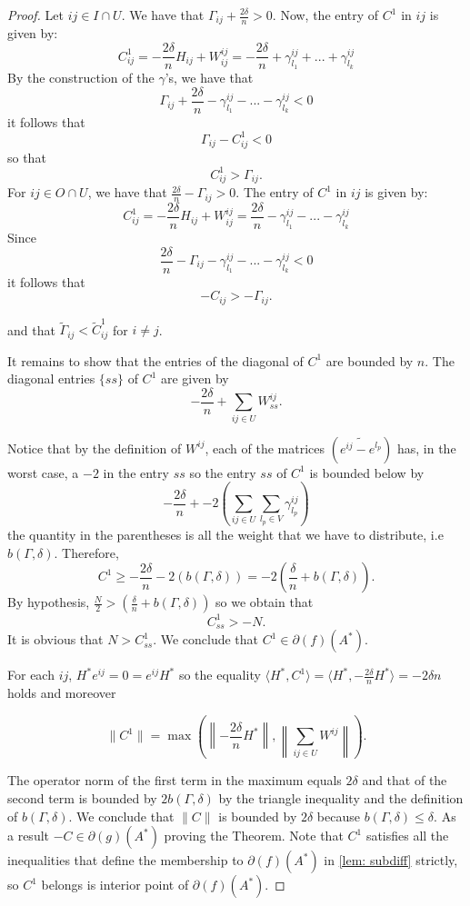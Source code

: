\documentclass[12pt]{amsart}
\theoremstyle{remark}
\begin{document}
\begin{proof}
Let $ij \in I\cap U$. We have that $\Gamma_{ij}+\frac{2\delta}{n}>0$.
Now, the entry of $C^1$ in $ij$ is given by:
\[
C^1_{ij} = -\frac{2\delta}{n}H_{ij}+W^{ij}_{ij} = - \frac{2\delta}{n}+\gamma^{ij}_{l_1}+...+\gamma^{ij}_{l_k}
\]
By the construction of the $\gamma$'s, we have that
\[
\Gamma_{ij}+\frac{2\delta}{n}-\gamma^{ij}_{l_1}-...-\gamma^{ij}_{l_k}<0
\]
it follows that 
\[
\Gamma_{ij}-C^1_{ij}<0
\]
so that
\[
C^1_{ij}>\Gamma_{ij}.
\]
For $ij \in O\cap U$, we have that $\frac{2\delta}{n}-\Gamma_{ij}>0$.
The entry of $C^1$ in $ij$ is given by:
\[
C^1_{ij}=-\frac{2\delta}{n}H_{ij}+W^{ij}_{ij} = \frac{2\delta}{n}-\gamma^{ij}_{l_1}-...-\gamma^{ij}_{l_k}
\]
Since
\[
\frac{2\delta}{n}-\Gamma_{ij}-\gamma^{ij}_{l_1}-...-\gamma^{ij}_{l_k}<0
\]
it follows that
\[
-C_{ij}>-\Gamma_{ij}.
\]

and that $\widetilde{\Gamma}_{ij} < \widetilde{C}^1_{ ij}$ for $i\neq j$. 

It remains to show that the entries of the diagonal of $C^1$ are bounded by $n$. The diagonal entries $\{ss\}$ of $C^1$ are given by
\[
-\frac{2\delta}{n}+ \sum_{ij\in U} W^{ij}_{ss}.
\]


Notice that by the definition of $W^{ij}$, each of the matrices $(\widetilde{e^{ij}-e^{l_p}} )$ has, in the worst case, a $-2$ in the entry $ss$ so the entry $ss$ of $C^1$ is bounded below by 
\[
-\frac{2\delta}{n}+-2 \left(\sum_{ij\in U}\sum_{l_p \in V} \gamma_{l_p}^{ij}\right)
\]
the quantity in the parentheses is all the weight that we have to distribute, i.e $b(\Gamma,\delta)$.
Therefore, 
\[
C^1 \geq -\frac{2\delta}{n}-2(b(\Gamma,\delta)) =-2\left(\frac{\delta}{n}+b(\Gamma,\delta)\right).
\]
By hypothesis, $ \frac{N}{2} > \left(\frac{\delta}{n}+b(\Gamma,\delta) \right) $ so we obtain that
\[
C^1_{ss} > -N.
\]
It is obvious that $N > C^1_{ss}$.
We conclude that $C^1 \in \partial(f)(A^*)$.

For each $ij$, $H^*e^{ij}=0=e^{ij}H^*$ so the equality $\langle H^*, C^1\rangle =\langle H^*,-\frac{2\delta}{n}H^*\rangle = -2\delta n$ holds and moreover

\[ \| C^1\|=\max\left(\left\|-\frac{2\delta}{n}H^*\right\|, \left\|\sum_{ij\in U} W^{ij} \right\|\right).
\]


The operator norm of the first term in the maximum equals $2\delta$ and that of the second term is bounded by $2b(\Gamma,\delta)$ by the triangle inequality and the definition of $b(\Gamma,\delta)$. We conclude that $\|C\|$ is bounded by $2\delta$ because $b(\Gamma,\delta)\leq \delta$. As a result $-C\in \partial\left(g\right)(A^*)$ proving the Theorem. Note that $C^1$ satisfies all the inequalities that define the membership to $\partial(f)(A^*)$ in \ref{lem: subdiff} strictly, so $C^1$ belongs is interior point of $\partial(f)(A^*)$.





\end{proof}
\end{document}
